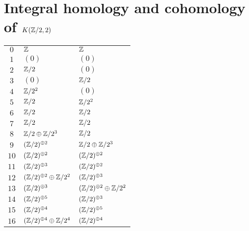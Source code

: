 \section{Integral homology and cohomology of $K(\mathbb{Z}/2,2)$}\label{A:integral homology of K(Z/2,2)}

\tablelasttail{\hline}
\begin{supertabular}{|c|p{5.5cm}|p{5.5cm}|}
$0$%
&$\mathbb{Z}$%
&$\mathbb{Z}$\\

$1$%
&$(0)$%
&$(0)$\\

$2$%
&$\mathbb{Z}/2$%
&$(0)$\\

$3$%
&$(0)$%
&$\mathbb{Z}/2$\\

$4$%
&$\mathbb{Z}/2^{2}$%
&$(0)$\\

$5$%
&$\mathbb{Z}/2$%
&$\mathbb{Z}/2^{2}$\\

$6$%
&$\mathbb{Z}/2$%
&$\mathbb{Z}/2$\\

$7$%
&$\mathbb{Z}/2$%
&$\mathbb{Z}/2$\\

$8$%
&$\mathbb{Z}/2\oplus\mathbb{Z}/2^{3}$%
&$\mathbb{Z}/2$\\

$9$%
&$(\mathbb{Z}/2)^{\oplus2}$%
&$\mathbb{Z}/2\oplus\mathbb{Z}/2^{3}$\\

$10$%
&$(\mathbb{Z}/2)^{\oplus2}$%
&$(\mathbb{Z}/2)^{\oplus2}$\\

$11$%
&$(\mathbb{Z}/2)^{\oplus3}$%
&$(\mathbb{Z}/2)^{\oplus2}$\\

$12$%
&$(\mathbb{Z}/2)^{\oplus2}\oplus\mathbb{Z}/2^{2}$%
&$(\mathbb{Z}/2)^{\oplus3}$\\

$13$%
&$(\mathbb{Z}/2)^{\oplus3}$%
&$(\mathbb{Z}/2)^{\oplus2}\oplus\mathbb{Z}/2^{2}$\\

$14$%
&$(\mathbb{Z}/2)^{\oplus5}$%
&$(\mathbb{Z}/2)^{\oplus3}$\\

$15$%
&$(\mathbb{Z}/2)^{\oplus4}$%
&$(\mathbb{Z}/2)^{\oplus5}$\\

$16$%
&$(\mathbb{Z}/2)^{\oplus4}\oplus\mathbb{Z}/2^{4}$%
&$(\mathbb{Z}/2)^{\oplus4}$\\


\end{supertabular}
